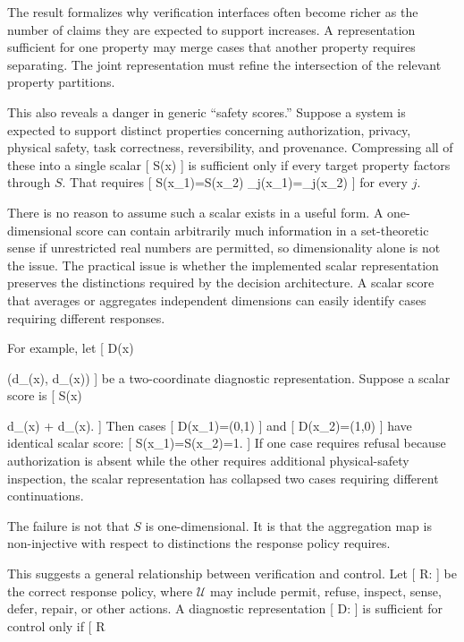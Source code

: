 \documentclass[11pt]{article}
\begin{document}
The result formalizes why verification interfaces often become richer as the number of claims they are expected to support increases. A representation sufficient for one property may merge cases that another property requires separating. The joint representation must refine the intersection of the relevant property partitions.

This also reveals a danger in generic ``safety scores.'' Suppose a system is expected to support distinct properties concerning authorization, privacy, physical safety, task correctness, reversibility, and provenance. Compressing all of these into a single scalar
[
S(x)\in{}
]
is sufficient only if every target property factors through $S$. That requires
[
S(x_1)=S(x_2)
\Longrightarrow
\Phi_j(x_1)=\Phi_j(x_2)
]
for every $j$.

There is no reason to assume such a scalar exists in a useful form. A one-dimensional score can contain arbitrarily much information in a set-theoretic sense if unrestricted real numbers are permitted, so dimensionality alone is not the issue. The practical issue is whether the implemented scalar representation preserves the distinctions required by the decision architecture. A scalar score that averages or aggregates independent dimensions can easily identify cases requiring different responses.

For example, let
[
D(x)

(d_{}(x),
d_{}(x))
]
be a two-coordinate diagnostic representation. Suppose a scalar score is
[
S(x)

d_{}(x)
+
d_{}(x).
]
Then cases
[
D(x_1)=(0,1)
]
and
[
D(x_2)=(1,0)
]
have identical scalar score:
[
S(x_1)=S(x_2)=1.
]
If one case requires refusal because authorization is absent while the other requires additional physical-safety inspection, the scalar representation has collapsed two cases requiring different continuations.

The failure is not that $S$ is one-dimensional. It is that the aggregation map is non-injective with respect to distinctions the response policy requires.

This suggests a general relationship between verification and control. Let
[
R:\rightarrow{}
]
be the correct response policy, where $\mathcal{U}$ may include permit, refuse, inspect, sense, defer, repair, or other actions. A diagnostic representation
[
D:\rightarrow{}
]
is sufficient for control only if
[
R
\end{document}
